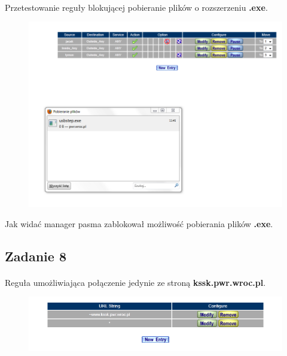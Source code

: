 \documentclass[wide,a4paper,titlepage,12pt] {article}
\begin{document}
  \paragraph{}
  Przetestowanie reguły blokującej pobieranie plików o rozszerzeniu \textbf{.exe}.
  \begin{figure}[h!]
    \begin{center}
      \includegraphics[width=\textwidth]{pobieranie_exe.PNG}
    \end{center}
  \end{figure}

  Jak widać manager pasma zablokował możliwość pobierania plików \textbf{.exe}.


  \subsection{Zadanie 8}
  \paragraph{}
  Reguła umożliwiająca połączenie jedynie ze stroną \textbf{kssk.pwr.wroc.pl}.
  \begin{figure}[h!]
    \begin{center}
      \includegraphics[width=\textwidth]{8.PNG}
    \end{center}
  \end{figure}
\end{document}
